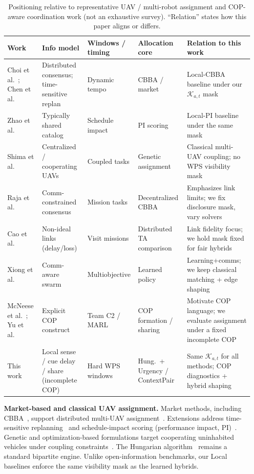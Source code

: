 \documentclass[journal,twocolumn,10pt]{IEEEtran}
\begin{document}
\begin{table}[t]
\centering
\caption{Positioning relative to representative UAV / multi-robot assignment and COP-aware coordination work (not an exhaustive survey). ``Relation'' states how this paper aligns or differs.}
\label{tab:positioning}
\setlength{\tabcolsep}{4pt}
\begin{tabular}{p{2.6cm}p{2.8cm}p{2.2cm}p{2.6cm}p{4.4cm}}
\toprule
Work & Info model & Windows / timing & Allocation core & Relation to this work \\
\midrule
Choi et al.~\cite{choi2009cbba}; Chen et al.~\cite{chen2021cbba} & Distributed consensus; time-sensitive replan & Dynamic tempo & CBBA / market & Local-CBBA baseline under our \(\mathcal{K}_{a,t}\) mask \\
Zhao et al.~\cite{zhao2016pi} & Typically shared catalog & Schedule impact & PI scoring & Local-PI baseline under the same mask \\
Shima et al.~\cite{shima2006multiple} & Centralized / cooperating UAVs & Coupled tasks & Genetic assignment & Classical multi-UAV coupling; no WPS visibility mask \\
Raja et al.~\cite{raja2021communication} & Comm-constrained consensus & Mission tasks & Decentralized CBBA & Emphasizes link limits; we fix disclosure mask, vary solvers \\
Cao et al.~\cite{cao2025communication} & Non-ideal links (delay/loss) & Visit missions & Distributed TA comparison & Link fidelity focus; we hold mask fixed for fair hybrids \\
Xiong et al.~\cite{xiong2026cata} & Comm-aware swarm & Multiobjective & Learned policy & Learning+comms; we keep classical matching + edge shaping \\
McNeese et al.~\cite{mcneese2006cop}; Yu et al.~\cite{yu2023cop} & Explicit COP construct & Team C2 / MARL & COP formation / sharing & Motivate COP language; we evaluate assignment under a fixed incomplete COP \\
This work & Local sense / cue delay / share (incomplete COP) & Hard WPS windows & Hung.\ + Urgency / ContextPair & Same \(\mathcal{K}_{a,t}\) for all methods; COP diagnostics + hybrid shaping \\
\bottomrule
\end{tabular}
\end{table}

\textbf{Market-based and classical UAV assignment.}
Market methods, including CBBA~\cite{choi2009cbba}, support distributed multi-UAV assignment~\cite{dias2006market,poudel2022survey}.
Extensions address time-sensitive replanning~\cite{chen2021cbba} and schedule-impact scoring (performance impact, PI)~\cite{zhao2016pi}.
Genetic and optimization-based formulations target cooperating uninhabited vehicles under coupling constraints~\cite{shima2006multiple}.
The Hungarian algorithm~\cite{kuhn1955hungarian} remains a standard bipartite engine.
Unlike open-information benchmarks, our Local baselines enforce the same visibility mask as the learned hybrids.
\end{document}
